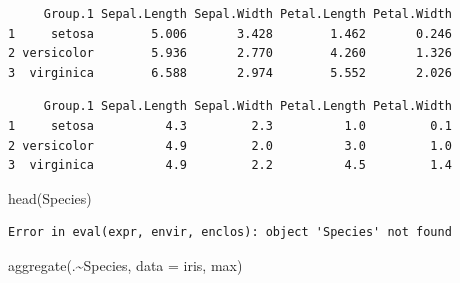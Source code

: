 \documentclass[
  letterpaper,
  DIV=11,
  numbers=noendperiod]{scrreprt}
\newenvironment{Shaded}{\begin{snugshade}}{\end{snugshade}}
\newcommand{\AttributeTok}[1]{\textcolor[rgb]{0.40,0.45,0.13}{#1}}
\newcommand{\CommentTok}[1]{\textcolor[rgb]{0.37,0.37,0.37}{#1}}
\newcommand{\DecValTok}[1]{\textcolor[rgb]{0.68,0.00,0.00}{#1}}
\newcommand{\FunctionTok}[1]{\textcolor[rgb]{0.28,0.35,0.67}{#1}}
\newcommand{\NormalTok}[1]{\textcolor[rgb]{0.00,0.23,0.31}{#1}}
\newcommand{\SpecialCharTok}[1]{\textcolor[rgb]{0.37,0.37,0.37}{#1}}
\newcommand{\StringTok}[1]{\textcolor[rgb]{0.13,0.47,0.30}{#1}}
\begin{document}
\begin{Shaded}
\end{Shaded}

\begin{verbatim}
     Group.1 Sepal.Length Sepal.Width Petal.Length Petal.Width
1     setosa        5.006       3.428        1.462       0.246
2 versicolor        5.936       2.770        4.260       1.326
3  virginica        6.588       2.974        5.552       2.026
\end{verbatim}

\begin{Shaded}
\end{Shaded}

\begin{verbatim}
     Group.1 Sepal.Length Sepal.Width Petal.Length Petal.Width
1     setosa          4.3         2.3          1.0         0.1
2 versicolor          4.9         2.0          3.0         1.0
3  virginica          4.9         2.2          4.5         1.4
\end{verbatim}

\begin{Shaded}
\begin{Highlighting}[]
\FunctionTok{head}\NormalTok{(Species)}
\end{Highlighting}
\end{Shaded}

\begin{verbatim}
Error in eval(expr, envir, enclos): object 'Species' not found
\end{verbatim}

\begin{Shaded}
\begin{Highlighting}[]
\FunctionTok{aggregate}\NormalTok{(.}\SpecialCharTok{\textasciitilde{}}\NormalTok{Species, }\AttributeTok{data =}\NormalTok{ iris, max)}
\end{Highlighting}
\end{Shaded}
\end{document}
